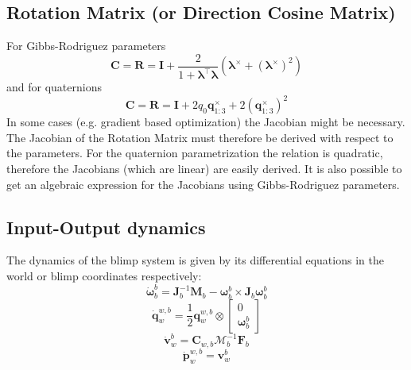 \subsection{Rotation Matrix (or Direction Cosine Matrix)}
For Gibbs-Rodriguez parameters
\begin{equation}
\mathbf{C} = \mathbf{R} = \mathbf{I} + \frac{2}{1+\boldsymbol{\lambda}^\top \boldsymbol{\lambda}}
\left(\boldsymbol{\lambda}^\times + \left(\boldsymbol{\lambda}^\times\right)^2\right)
\end{equation}
and for quaternions
\begin{equation}
\mathbf{C} = \mathbf{R} = \mathbf{I} + 2 q_0 \mathbf{q}_{1:3}^\times + 2 \left(\mathbf{q}_{1:3}^\times\right)^2
\end{equation}
In some cases (e.g. gradient based optimization) the Jacobian might be necessary. The Jacobian of the Rotation Matrix must therefore be derived with respect to the parameters. For the quaternion parametrization the relation is quadratic, therefore the Jacobians (which are linear) are easily derived.
It is also possible to get an algebraic expression for the Jacobians using Gibbs-Rodriguez parameters.

\subsection{Input-Output dynamics}
The dynamics of the blimp system is given by its differential equations in the world or blimp coordinates respectively:
\begin{equation}
\label{eqn_dyn_angular_velocity}
\dot{\boldsymbol{\omega}}_b^b = \mathbf{J}_b^{-1} \mathbf{M}_b  - \boldsymbol{\omega}_b^b \times \mathbf{J}_b \boldsymbol{\omega}_b^b
\end{equation}
\begin{equation}
\label{eqn_dyn_orientation}
\dot{\mathbf{q}}_w^{w,b} = \frac{1}{2} \mathbf{q}_w^{w,b} \otimes \left[
\begin{array}{c}
0 \\ \boldsymbol{\omega}_b^b
\end{array} \right]
\end{equation}
\begin{equation}
\label{eqn_dyn_velocity}
\dot{\mathbf{v}}_w^b = \mathbf{C}_{w,b}\mathbf{\mathcal{M}}_b^{-1} \mathbf{F}_b
\end{equation}
\begin{equation}
\label{eqn_dyn_position}
\dot{\mathbf{p}}_w^{w,b} = \mathbf{v}_w^b
\end{equation}

